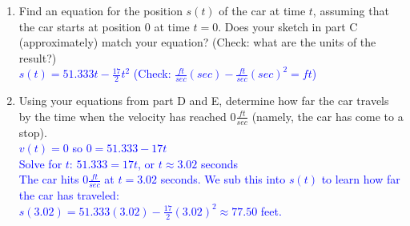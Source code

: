 \documentclass{ximera}
\begin{document}
\begin{exercise}
\begin{enumerate}
        \item[E.] Find an equation for the position $s(t)$ of the car at time $t$, assuming that the car starts at position 0 at time $t=0$. Does your sketch in part C (approximately) match your equation? (Check: what are the units of the result?)\\
        \textcolor{blue}{ $s(t)=51.333t-\frac{17}{2}t^2$ (Check: $\frac{ft}{sec}(sec)-\frac{ft}{sec}(sec)^2=ft$) }\\
        
        \item[F.] Using your equations from part D and E, determine how far the car travels by the time when the velocity has reached $0 \frac{ft}{sec}$ (namely, the car has come to a stop).\\
        \textcolor{blue}{ $v(t)=0$ so $0=51.333-17t$\\
        Solve for $t$: $51.333=17t$, or $t\approx 3.02$ seconds \\
        The car hits $0 \frac{ft}{sec}$ at $t=3.02$ seconds.  We sub this into $s(t)$ to learn how far the car has traveled:\\
        $s(3.02)=51.333(3.02)-\frac{17}{2}(3.02)^2\approx77.50$ feet.}\\
    \end{enumerate}
\end{exercise} 
    
\end{document}
